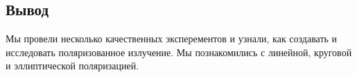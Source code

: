 \subsection*{Вывод}
Мы провели несколько качественных эксперементов и узнали, как создавать и исследовать поляризованное излучение. Мы познакомились с линейной, круговой и эллиптической поляризацией.












